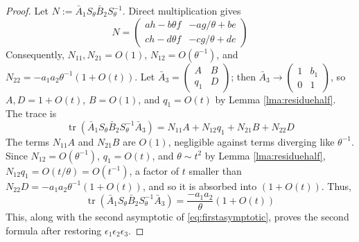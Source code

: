 \documentclass{article}
\DeclareMathOperator{\tr}{tr}
\theoremstyle{plain}
\theoremstyle{definition}
\theoremstyle{plain}
\theoremstyle{plain}
\theoremstyle{plain}
\theoremstyle{remark}
\theoremstyle{remark}
\theoremstyle{plain}
\theoremstyle{plain}
\theoremstyle{plain}
\theoremstyle{plain}
\begin{document}
\begin{proof}
Let $N := \bar A_1S_\theta\bar B_2S_\theta^{-1}$. Direct multiplication gives
\begin{equation*}
	N = \begin{pmatrix}ah-b\theta f & -ag/\theta + be \\ ch-d\theta f & -cg/\theta + de\end{pmatrix}
\end{equation*}
Consequently, $N_{11}, N_{21} = O(1)$, $N_{12} = O(\theta^{-1})$, and $N_{22} = -a_1a_2\theta^{-1}(1+O(t))$. Let $\bar A_3 = \left(\begin{smallmatrix}A&B\\q_1&D\end{smallmatrix}\right)$; then $\bar A_3 \to \left(\begin{smallmatrix}1&b_1\\0&1\end{smallmatrix}\right)$, so $A, D = 1  + O(t)$, $B = O(1)$, and $q_1 = O(t)$ by Lemma \ref{lma:residuehalf}. The trace is
\begin{equation*}
	\tr(\bar A_1S_\theta\bar B_2S_\theta^{-1}\bar A_3) = N_{11}A + N_{12}q_1 + N_{21}B + N_{22}D
\end{equation*}
The terms $N_{11}A$ and $N_{21}B$ are $O(1)$, negligible against terms diverging like $\theta^{-1}$. Since $N_{12} = O(\theta^{-1})$, $q_1 = O(t)$, and $\theta \sim t^2$ by Lemma \ref{lma:residuehalf}, $N_{12}q_1 = O(t/\theta) = O(t^{-1})$, a factor of $t$ smaller than $N_{22}D = -a_1a_2\theta^{-1}(1 + O(t))$, and so it is absorbed into $(1 + O(t))$. Thus,
\begin{equation*}
	\tr(\bar A_1S_\theta\bar B_2S_\theta^{-1}\bar A_3) = \frac{-a_1a_2}{\theta}(1 + O(t))
\end{equation*}
This, along with the second asymptotic of \eqref{eq:firstasymptotic}, proves the second formula after restoring $\epsilon_1\epsilon_2\epsilon_3$.

\medskip


\end{proof}
\end{document}
